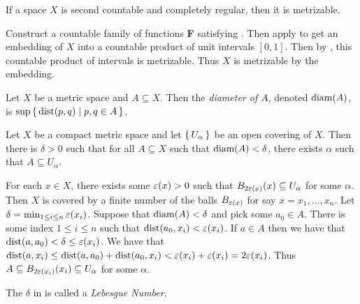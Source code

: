 \documentclass[letterpaper, 11pt]{article}
\begin{document}
\begin{thrm}
  If a space $X$ is second countable and completely regular, then it is metrizable.
\end{thrm}
\begin{pf}
  Construct a countable family of functions \textbf{F} satisfying .
  Then apply  to get an embedding of $X$ into a countable product of unit intervals $[0, 1]$.
  Then by , this countable product of intervals is metrizable.
  Thus $X$ is metrizable by the embedding.
\end{pf}

\begin{defn}
  Let $X$ be a metric space and $A \subseteq X$. Then the \emph{diameter of $A$}, denoted $\operatorname{diam}(A)$, is $\sup\set{\operatorname{dist}(p, q) | p, q \in A}$.
\end{defn}

\begin{lem}\label{lem: lebesgue_lemma}
  Let $X$ be a compact metric space and let $\set{U_{\alpha}}$ be an open covering of $X$.
  Then there is $\delta > 0$ such that for all $A \subseteq X$ such that $\operatorname{diam}(A) < \delta$, there exists $\alpha$ such that $A \subseteq U_{\alpha}$.
\end{lem}
\begin{pf}
  For each $x \in X$, there exists some $\varepsilon(x) > 0$ such that $B_{2\varepsilon(x)}(x) \subseteq U_{\alpha}$ for some $\alpha$.
  Then $X$ is covered by a finite number of the balls $B_{\varepsilon(x)}$ for say $x = x_{1}, \ldots, x_{n}$.
  Let $\delta = \min_{1 \leq i \leq n} \varepsilon(x_{i})$.
  Suppose that $\operatorname{diam}(A) < \delta$ and pick some $a_{0} \in A$.
  There is some index $1 \leq i \leq n$ such that $\operatorname{dist}(a_{0}, x_{i}) < \varepsilon(x_{i})$.
  If $a \in A$ then we have that $\operatorname{dist}(a, a_{0}) < \delta \leq \varepsilon(x_{i})$.
  We have that $\operatorname{dist}(a, x_{i}) \leq \operatorname{dist}(a, a_{0}) + \operatorname{dist}(a_{0}, x_{i}) < \varepsilon(x_{i}) + \varepsilon(x_{i}) = 2\varepsilon(x_{i})$.
  Thus $A \subseteq B_{2\varepsilon(x_{i})}(x_{i}) \subseteq U_{\alpha}$ for some $\alpha$.
\end{pf}

\begin{defn}
  The $\delta$ in  is called a \emph{Lebesgue Number}.
\end{defn}


\clearpage
\nocite{book:Steen_Seebach}
\nocite{note:conrad_topologist_sine}
\nocite{note:compactness_review}
\printbibliography
\end{document}
